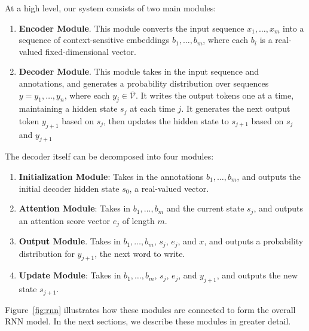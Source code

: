 \documentclass[11pt,letterpaper]{article}
\newcommand{\vocabout}{\overline{\mathcal{V}}}
\newcommand\pl[1]{}
\newcommand\rj[1]{}
\begin{document}
At a high level, our system consists of two main modules:
\begin{enumerate}
  \item \textbf{Encoder Module}.  This module 
    converts the input sequence $x_1, \dotsc, x_m$
    into a sequence of context-sensitive embeddings
    $b_1, \dotsc, b_m$,
    where each $b_i$ is a real-valued fixed-dimensional vector.
  \item \textbf{Decoder Module}.  This module
    takes in the input sequence and annotations,
    and generates a probability distribution
    over sequences $y = y_1, \dotsc, y_n$,
    where each $y_j \in \vocabout$.
    It writes the output tokens one at a time,
    maintaining a hidden state $s_j$ at each time $j$.
    It generates the next output token $y_{j+1}$ based on $s_j$,
    then updates the hidden state to $s_{j+1}$ based on
    $s_j$ and $y_{j+1}$
\end{enumerate}
The decoder itself can be decomposed into four modules:
\begin{enumerate}
  \item \textbf{Initialization Module}:
    Takes in the annotations $b_1, \dotsc, b_m$, and
    outputs the initial decoder hidden state $s_0$,
    a real-valued vector.
  \item \textbf{Attention Module}:
    Takes in $b_1, \dotsc, b_m$ and the current state $s_j$,
    and outputs an attention score vector $e_j$ of length $m$.
  \item \textbf{Output Module}.  
    Takes in $b_1, \dotsc, b_m$, $s_j$, $e_j$, and $x$,
    and outputs a probability distribution 
    for $y_{j+1}$, the next word to write.
  \item \textbf{Update Module}: 
    Takes in $b_1, \dotsc, b_m$, $s_j$, $e_j$, and $y_{j+1}$,
    and outputs the new state $s_{j+1}$.
\end{enumerate}
\pl{Move the second sentences in the three bullets into 'Decoder Module'
  and cut the first sentence.
  This text is currently taking up a lot of space and kind of wordy.
}
\rj{I couldn't really see moving it all into "Decoder Module".  How does this look?
Also, I realized that 4 modules makes more sense than 3.}
Figure~\ref{fig:rnn} illustrates how these modules are connected
to form the overall RNN model.
In the next sections, we describe these modules in greater detail.

\end{document}
